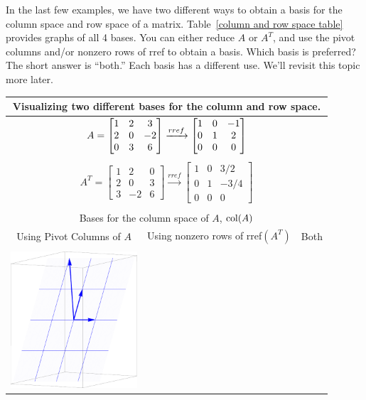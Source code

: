 In the last few examples, we have two different ways to obtain a basis for the column space and row space of a matrix. Table~\ref{column and row space table} provides graphs of all 4 bases. You can either reduce $A$ or $A^T$, and use the pivot columns and/or nonzero rows of rref to obtain a basis. Which basis is preferred?  The short answer is ``both.''  Each basis has a different use.  We'll revisit this topic more later.

\begin{table}

\begin{tabular}{ccc}
\multicolumn{3}{c}{
Visualizing two different bases for the column and row space. 
}
\\\hline
\multicolumn{3}{c}{
$
A=
\begin{bmatrix}
\begin{matrix} 1\\2\\0 \end{matrix}
&\begin{matrix} 2\\0\\3 \end{matrix}
&\begin{matrix} 3\\-2\\6 \end{matrix}
\end{bmatrix}
\xrightarrow{rref}
\begin{bmatrix}
\begin{matrix} 1\\0\\0 \end{matrix}
&\begin{matrix} 0\\1\\0 \end{matrix}
&\begin{matrix} -1\\2\\0 \end{matrix}
\end{bmatrix}
$}
\\ \\
\multicolumn{3}{c}{
$
A^T
=
\begin{bmatrix}
 1 & 2 & 0 \\
 2 & 0 & 3 \\
 3 & -2 & 6
\end{bmatrix}
\xrightarrow{rref}
\begin{bmatrix}
 1 & 0 & {3}/{2} \\
 0 & 1 & -{3}/{4} \\
 0 & 0 & 0
\end{bmatrix}
$
}
\\ \\
\hline\hline \multicolumn{3}{c}{Bases for the column space of $A$, $\operatorname{col}(A)$}\\
\hline Using Pivot Columns of $A$ & Using nonzero rows of rref$(A^T)$ & Both\\ \\
\includegraphics[height=2in]{02-Applications/support/colspace1}

\end{tabular}
\end{table}
